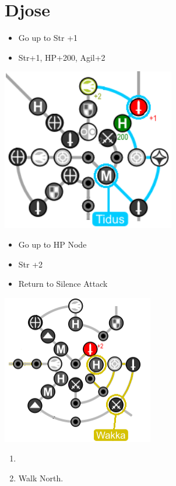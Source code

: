 \chapter{Djose}

\begin{spheregrid}
\begin{itemize}
	\tidusf
	\begin{itemize}
		\item Go up to Str +1
		\item Str+1, HP+200, Agil+2
	\end{itemize}
	\includegraphics{graphics/djosetidus}
	\wakkaf
	\begin{itemize}
		\item Go up to HP Node
		\item Str +2
		\item Return to Silence Attack
	\end{itemize}
	\includegraphics{graphics/djosewakka}
\end{itemize}
\end{spheregrid}
\begin{enumerate}
	\item \formation{\tidus}{\yuna}{\auron}
	\item Walk North.
\end{enumerate}
